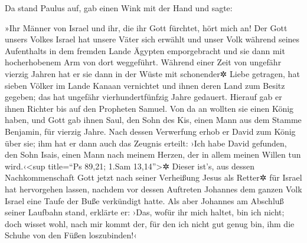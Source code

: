  Da stand Paulus auf, gab einen Wink mit der Hand und
sagte:

»Ihr Männer von Israel und ihr, die ihr Gott fürchtet, hört mich an!
 Der Gott unsers Volkes Israel hat unsere Väter sich
erwählt und unser Volk während seines Aufenthalts in dem fremden Lande
Ägypten emporgebracht und sie dann mit hocherhobenem Arm von dort
weggeführt.  Während einer Zeit von ungefähr vierzig
Jahren hat er sie dann in der Wüste mit schonender✲ Liebe getragen,
 hat sieben Völker im Lande Kanaan vernichtet und ihnen
deren Land zum Besitz gegeben;  das hat ungefähr
vierhundertfünfzig Jahre gedauert. Hierauf gab er ihnen Richter bis auf
den Propheten Samuel.  Von da an wollten sie einen König
haben, und Gott gab ihnen Saul, den Sohn des Kis, einen Mann aus dem
Stamme Benjamin, für vierzig Jahre.  Nach dessen
Verwerfung erhob er David zum König über sie; ihm hat er dann auch das
Zeugnis erteilt: ›Ich habe David gefunden, den Sohn Isais, einen Mann
nach meinem Herzen, der in allem meinen Willen tun wird.‹\textless sup
title=``Ps 89,21; 1.Sam 13,14''\textgreater✲  Dieser
ist's, aus dessen Nachkommenschaft Gott jetzt nach seiner Verheißung
Jesus als Retter✲ für Israel hat hervorgehen lassen, 
nachdem vor dessen Auftreten Johannes dem ganzen Volk Israel eine Taufe
der Buße verkündigt hatte.  Als aber Johannes am Abschluß
seiner Laufbahn stand, erklärte er: ›Das, wofür ihr mich haltet, bin ich
nicht; doch wisset wohl, nach mir kommt der, für den ich nicht gut genug
bin, ihm die Schuhe von den Füßen loszubinden!‹

